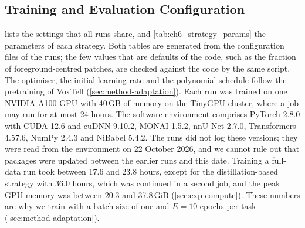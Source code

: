 \subsection{Training and Evaluation Configuration}
\label{subsec:exp-config}

 lists the settings that all runs share, and \cref{tab:ch6_strategy_params} the parameters of each strategy.
Both tables are generated from the configuration files of the runs; the few values that are defaults of the code, such as the fraction of foreground-centred patches, are checked against the code by the same script.
The optimiser, the initial learning rate and the polynomial schedule follow the pretraining of VoxTell (\cref{sec:method-adaptation}).
Each run was trained on one NVIDIA A100 GPU with 40\,GB of memory on the TinyGPU cluster, where a job may run for at most 24 hours.
The software environment comprises PyTorch 2.8.0 with CUDA 12.6 and cuDNN 9.10.2, MONAI 1.5.2, nnU-Net 2.7.0, Transformers 4.57.6, NumPy 2.4.3 and NiBabel 5.4.2.
The runs did not log these versions; they were read from the environment on 22 October 2026, and we cannot rule out that packages were updated between the earlier runs and this date.
Training a full-data run took between 17.6 and 23.8 hours, except for the distillation-based strategy with 36.0 hours, which was continued in a second job, and the peak GPU memory was between 20.3 and 37.8\,GiB (\cref{sec:exp-compute}).
These numbers are why we train with a batch size of one and $E = 10$ epochs per task (\cref{sec:method-adaptation}).

\begin{table}[tb]
\centering
\caption[Training and evaluation settings shared by all runs]{Training and evaluation settings shared by all runs (\cref{sec:method-adaptation}). Generated from the run configurations; code defaults checked against the code.}
\label{tab:ch6_hparams}

\end{table}

\begin{table}[tbp] %
\centering
\caption[Parameters of the strategies]{Parameters of the strategies (\cref{sec:method-strategies}). Sequential fine-tuning has no parameters of its own. Bold: rank used in the comparison of the strategies; scaling factor $\gamma_r = \alpha/\sqrt{r}$ listed per rank. The gradient scale of the prompt-tuning strategy was not active in the evaluated run (\cref{subsec:method-prompt}), and the weight ensemble of the distillation-based strategy was not evaluated (\cref{subsec:method-distillation}).}
\label{tab:ch6_strategy_params}

\end{table}

